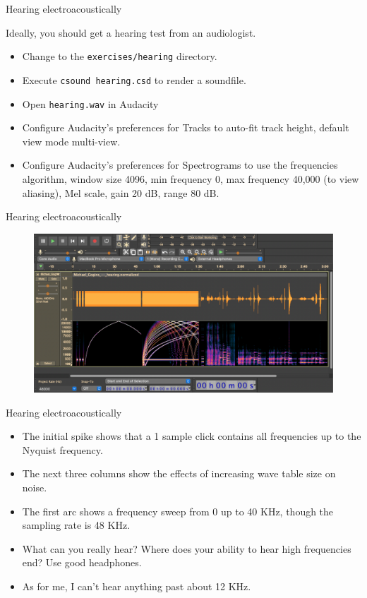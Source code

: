 \documentclass{beamer}
\begin{document}
\begin{frame}{Hearing electroacoustically}
\begin{example}
Ideally, you should get a hearing test from an audiologist.
\begin{itemize}
\item Change to the \texttt{exercises/hearing} directory.
\item Execute \texttt{csound hearing.csd} to render a soundfile.
\item Open \texttt{hearing.wav} in Audacity
\item Configure Audacity's preferences for Tracks to auto-fit track height, default view mode multi-view.
\item Configure Audacity's preferences for Spectrograms to use the frequencies algorithm, window size 4096, min frequency 0, max frequency 40,000 (to view aliasing), Mel scale, gain 20 dB, range 80 dB.
\end{itemize}
\end{example}
\end{frame}

\begin{frame}{Hearing electroacoustically}
\begin{figure}
\centerline{\includegraphics[height = 0.66\textwidth]{hearing}}
\end{figure}
\end{frame}

\begin{frame}{Hearing electroacoustically}
\begin{itemize}
\item The initial spike shows that a 1 sample click contains all frequencies up to the Nyquist frequency.
\item The next three columns show the effects of increasing wave table size on noise.
\item The first arc shows a frequency sweep from 0 up to 40 KHz, though the sampling rate is 48 KHz.
\item What can you really hear? Where does your ability to hear high frequencies end? Use good headphones.
\item As for me, I can't hear anything past about 12 KHz.
\end{itemize}
\end{frame}
\end{document}
